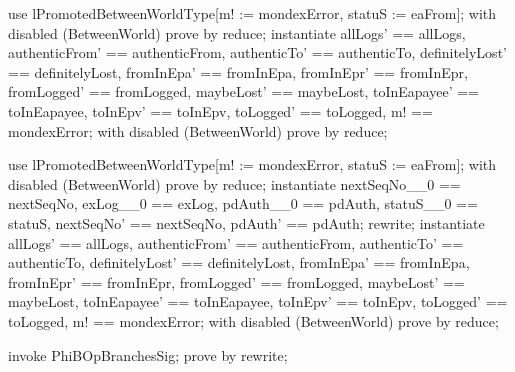 \begin{LPScript}\begin{zproof}[tBetwReadExceptionLogEafromOkayPRE]
    use lPromotedBetweenWorldType[m! := mondexError, statuS := eaFrom];
    with disabled (BetweenWorld) prove by reduce;
    instantiate allLogs' == allLogs, authenticFrom' == authenticFrom,
        authenticTo' == authenticTo, definitelyLost' == definitelyLost,
        fromInEpa' == fromInEpa, fromInEpr' == fromInEpr,
        fromLogged' == fromLogged, maybeLost' == maybeLost,
        toInEapayee' == toInEapayee, toInEpv' == toInEpv,
        toLogged' == toLogged, m! == mondexError;
    with disabled (BetweenWorld) prove by reduce;
\end{zproof}\end{LPScript}

\begin{LPScript}\begin{zproof}[tBetwReadExceptionLogOkayPRE]
    use lPromotedBetweenWorldType[m! := mondexError, statuS := eaFrom];
    with disabled (BetweenWorld) prove by reduce;
    instantiate nextSeqNo\_\_0 == nextSeqNo, exLog\_\_0 == exLog,
        pdAuth\_\_0 == pdAuth, statuS\_\_0 == statuS,
        nextSeqNo' == nextSeqNo, pdAuth' == pdAuth;
    rewrite;
    instantiate allLogs' == allLogs, authenticFrom' == authenticFrom,
        authenticTo' == authenticTo, definitelyLost' == definitelyLost,
        fromInEpa' == fromInEpa, fromInEpr' == fromInEpr,
        fromLogged' == fromLogged, maybeLost' == maybeLost,
        toInEapayee' == toInEapayee, toInEpv' == toInEpv,
        toLogged' == toLogged, m! == mondexError;
    with disabled (BetweenWorld) prove by reduce;
\end{zproof}\end{LPScript}

\begin{LDCheck}\begin{zproof}
    invoke PhiBOpBranchesSig;
    prove by rewrite;
\end{zproof}\end{LDCheck}

